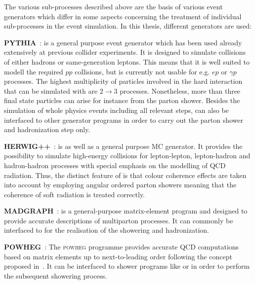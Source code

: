 The various sub-processes described above are the basis of various event generators which differ in some aspects concerning the treatment of individual sub-processes in the event simulation. In this thesis, different generators are used:
\begin{description}
 \item \textbf{PYTHIA}~\cite{Sjostrand:2006za}: \pythia is a general purpose event generator which has been used already extensively at previous collider experiments. It is designed to simulate collisions of either hadrons or same-generation leptons. This means that it is well suited to modell the required $pp$ collisions, but is currently not usable for e.g. $ep$ or $\gamma p$ processes. The highest multiplicity of particles involved in the hard interaction that can be simulated with \pythia are $2 \rightarrow 3$ processes. Nonetheless, more than three final state particles can arise for instance from the parton shower. Besides the simulation of whole physics events including all relevant steps, \pythia can also be interfaced to other generator programs in order to carry out the parton shower and hadronization step only.
 \item \textbf{HERWIG++}~\cite{Bahr:2008pv}: \herwig is as well as \pythia a general purpose MC generator. It provides the possibility to simulate high-energy collisions for lepton-lepton, lepton-hadron and hadron-hadron processes with special emphasis on the modelling of QCD radiation. Thus, the distinct feature of \herwig is that colour coherence effects are taken into account by employing angular ordered parton showers meaning that the coherence of soft radiation is treated correctly.
 \item \textbf{MADGRAPH}~\cite{Alwall:2007st, Alwall:2014hca}: \madgraph is a general-purpose matrix-element program and designed to provide accurate descriptions of multiparton processes. It can commonly be interfaced to \pythia for the realisation of the showering and hadronization.
 \item \textbf{POWHEG}~\cite{Oleari:2010nx}: The \textsc{powheg} programme provides accurate QCD computations based on matrix elements up to next-to-leading order following the concept proposed in~\cite{Nason:2004rx}. It can be interfaced to shower programs like \pythia or \herwig in order to perform the subsequent showering process.   
\end{description}
